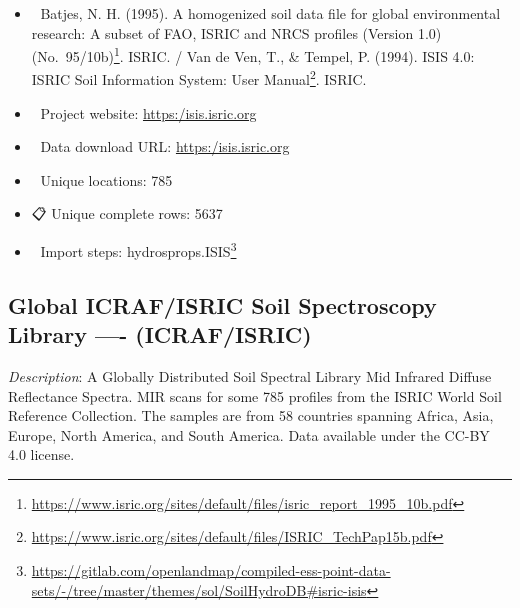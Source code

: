 \documentclass[
  graybox,natbib,nospthms]{svmono}
\providecommand{\tightlist}{%
  \setlength{\itemsep}{0pt}\setlength{\parskip}{0pt}}
\providecommand{\tightlist}{\setlength{\itemsep}{0pt}\setlength{\parskip}{0pt}}
\renewcommand{\href}[2]{#2 (\url{#1})}
\renewcommand{\href}[2]{#2\footnote{\url{#1}}}
\begin{document}
\begin{itemize}
\tightlist
\item
  📕 Batjes, N. H. (1995). \href{https://www.isric.org/sites/default/files/isric_report_1995_10b.pdf}{A homogenized soil data file for global
  environmental research: A subset of FAO, ISRIC and NRCS profiles (Version 1.0) (No.~95/10b)}. ISRIC. / Van de Ven, T., \& Tempel, P. (1994). \href{https://www.isric.org/sites/default/files/ISRIC_TechPap15b.pdf}{ISIS 4.0: ISRIC Soil Information System: User Manual}. ISRIC.\\
\item
  🔗 Project website: \url{https:/isis.isric.org}\\
\item
  📂 Data download URL: \url{https:/isis.isric.org}\\
\item
  📍 Unique locations: 785\\
\item
  📋 Unique complete rows: 5637\\
\item
  📝 Import steps: \href{https://gitlab.com/openlandmap/compiled-ess-point-data-sets/-/tree/master/themes/sol/SoilHydroDB\#isric-isis}{hydrosprops.ISIS}
\end{itemize}

\hypertarget{global-icrafisric-soil-spectroscopy-library---icrafisric}{%
\subsection{Global ICRAF/ISRIC Soil Spectroscopy Library ---- (ICRAF/ISRIC)}\label{global-icrafisric-soil-spectroscopy-library---icrafisric}}

\emph{Description}: A Globally Distributed Soil Spectral Library Mid Infrared Diffuse
Reflectance Spectra. MIR scans for some 785 profiles from the ISRIC World Soil Reference Collection.
The samples are from 58 countries spanning Africa, Asia, Europe, North America, and South America.
Data available under the CC-BY 4.0 license.
\end{document}
